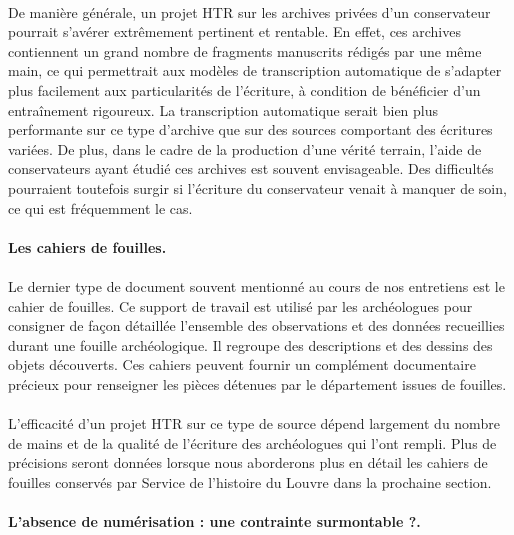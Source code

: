 \documentclass[a4paper,12pt,twoside]{book}
\begin{document}
\paragraph{}
De manière générale, un projet HTR sur les archives privées d’un conservateur pourrait s'avérer extrêmement pertinent et rentable. En effet, ces archives contiennent un grand nombre de fragments manuscrits rédigés par une même main, ce qui permettrait aux modèles de transcription automatique de s’adapter plus facilement aux particularités de l’écriture, à condition de bénéficier d’un entraînement rigoureux. La transcription automatique serait bien plus performante sur ce type d'archive que sur des sources comportant des écritures variées. De plus, dans le cadre de la production d’une vérité terrain, l’aide de conservateurs ayant étudié ces archives est souvent envisageable. Des difficultés pourraient toutefois surgir si l’écriture du conservateur venait à manquer de soin, ce qui est fréquemment le cas. 

\paragraph{Les cahiers de fouilles.}

\paragraph{}	
Le dernier type de document souvent mentionné au cours de nos entretiens est le cahier de fouilles. Ce support de travail est utilisé par les archéologues pour consigner de façon détaillée l'ensemble des observations et des données recueillies durant une fouille archéologique. Il regroupe des descriptions et des dessins des objets découverts. Ces cahiers peuvent fournir un complément documentaire précieux pour renseigner les pièces détenues par le département issues de fouilles.

\paragraph{}
L’efficacité d’un projet HTR sur ce type de source dépend largement du nombre de mains et de la qualité de l’écriture des archéologues qui l’ont rempli. Plus de précisions seront données lorsque nous aborderons plus en détail les cahiers de fouilles conservés par Service de l’histoire du Louvre dans la prochaine section.

\paragraph{L'absence de numérisation : une contrainte surmontable ?.}
\end{document}
